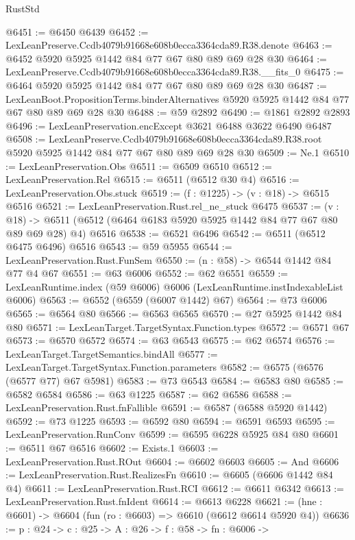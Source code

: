 \begin{lexlean}{RustStd}
\begin{coremodule}
@6451 := @6450 @6439
@6452 := LexLeanPreserve.Ccdb4079b91668e608b0ecca3364cda89.R38.denote
@6463 := @6452 @5920 @5925 @1442 @84 @77 @67 @80 @89 @69 @28 @30
@6464 := LexLeanPreserve.Ccdb4079b91668e608b0ecca3364cda89.R38.__fits_0
@6475 := @6464 @5920 @5925 @1442 @84 @77 @67 @80 @89 @69 @28 @30
@6487 := LexLeanBoot.PropositionTerms.binderAlternatives
    @5920
    @5925
    @1442
    @84
    @77
    @67
    @80
    @89
    @69
    @28
    @30
@6488 := @59 @2892
@6490 := @1861 @2892 @2893
@6496 := LexLeanPreservation.encExcept @3621 @6488 @3622 @6490 @6487
@6508 := LexLeanPreserve.Ccdb4079b91668e608b0ecca3364cda89.R38.root
    @5920
    @5925
    @1442
    @84
    @77
    @67
    @80
    @89
    @69
    @28
    @30
@6509 := Ne.{1}
@6510 := LexLeanPreservation.Obs
@6511 := @6509 @6510
@6512 := LexLeanPreservation.Rel
@6515 := @6511 (@6512 @30 @4)
@6516 := LexLeanPreservation.Obs.stuck
@6519 := (f : @1225) -> (v : @18) -> @6515 @6516
@6521 := LexLeanPreservation.Rust.rel_ne_stuck @6475
@6537 := (v : @18) ->
  @6511 (@6512 (@6464 @6183 @5920 @5925 @1442 @84 @77 @67 @80 @89 @69 @28) @4) @6516
@6538 := @6521 @6496
@6542 := @6511 (@6512 @6475 @6496) @6516
@6543 := @59 @5955
@6544 := LexLeanPreservation.Rust.FunSem
@6550 := (n : @58) -> @6544 @1442 @84 @77 @4 @67
@6551 := @63 @6006
@6552 := @62 @6551
@6559 := LexLeanRuntime.index (@59 @6006) @6006 (LexLeanRuntime.instIndexableList @6006)
@6563 := @6552 (@6559 (@6007 @1442) @67)
@6564 := @73 @6006
@6565 := @6564 @80
@6566 := @6563 @6565
@6570 := @27 @5925 @1442 @84 @80
@6571 := LexLeanTarget.TargetSyntax.Function.types
@6572 := @6571 @67
@6573 := @6570 @6572
@6574 := @63 @6543
@6575 := @62 @6574
@6576 := LexLeanTarget.TargetSemantics.bindAll
@6577 := LexLeanTarget.TargetSyntax.Function.parameters
@6582 := @6575 (@6576 (@6577 @77) @67 @5981)
@6583 := @73 @6543
@6584 := @6583 @80
@6585 := @6582 @6584
@6586 := @63 @1225
@6587 := @62 @6586
@6588 := LexLeanPreservation.Rust.fnFallible
@6591 := @6587 (@6588 @5920 @1442)
@6592 := @73 @1225
@6593 := @6592 @80
@6594 := @6591 @6593
@6595 := LexLeanPreservation.RunConv
@6599 := @6595 @6228 @5925 @84 @80
@6601 := @6511 @67 @6516
@6602 := Exists.{1}
@6603 := LexLeanPreservation.Rust.ROut
@6604 := @6602 @6603
@6605 := And
@6606 := LexLeanPreservation.Rust.RealizesFn
@6610 := @6605 (@6606 @1442 @84 @4)
@6611 := LexLeanPreservation.Rust.RCI
@6612 := @6611 @6342
@6613 := LexLeanPreservation.Rust.fnIdent
@6614 := @6613 @6228
@6621 := (hne : @6601) -> @6604 (fun (ro : @6603) => @6610 (@6612 @6614 @5920 @4))
@6636 := {p : @24} ->
  {c : @25} ->
  {A : @26} ->
  {f : @58} ->
  {fn : @6006} ->

\end{coremodule}
\end{lexlean}
